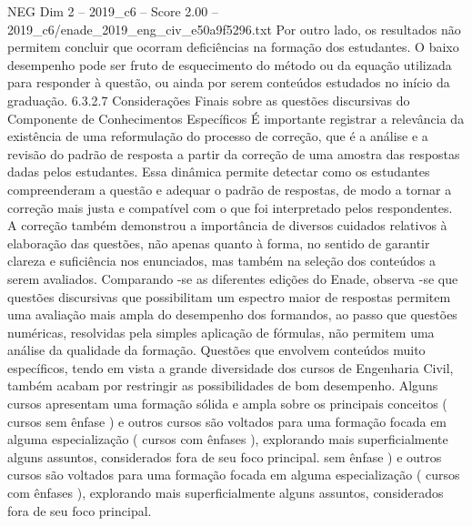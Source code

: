 \begin{textsample}{NEG Dim 2 – 2019\_c6 – Score 2.00 – 2019\_c6/enade\_2019\_eng\_civ\_e50a9f5296.txt}
Por outro lado, os resultados não permitem concluir que ocorram deficiências na formação dos estudantes.
O baixo desempenho pode ser fruto de esquecimento do método ou da equação utilizada para responder à questão, ou ainda por serem conteúdos estudados no início da graduação. 6.3.2.7 Considerações Finais sobre as questões discursivas do Componente de Conhecimentos Específicos É importante registrar a relevância da existência de uma reformulação do processo de correção, que é a análise e a revisão do padrão de resposta a partir da correção de uma amostra das respostas dadas pelos estudantes.
Essa dinâmica permite detectar como os estudantes compreenderam a questão e adequar o padrão de respostas, de modo a tornar a correção mais justa e compatível com o que foi interpretado pelos respondentes.
A correção também demonstrou a importância de diversos cuidados relativos à elaboração das questões, não apenas quanto à forma, no sentido de garantir clareza e suficiência nos enunciados, mas também na seleção dos conteúdos a serem avaliados.
Comparando -se as diferentes edições do Enade, observa -se que questões discursivas que possibilitam um espectro maior de respostas permitem uma avaliação mais ampla do desempenho dos formandos, ao passo que questões numéricas, resolvidas pela simples aplicação de fórmulas, não permitem uma análise da qualidade da formação.
Questões que envolvem conteúdos muito específicos, tendo em vista a grande diversidade dos cursos de Engenharia Civil, também acabam por restringir as possibilidades de bom desempenho.
Alguns cursos apresentam uma formação sólida e ampla sobre os principais conceitos ( cursos sem ênfase ) e outros cursos são voltados para uma formação focada em alguma especialização ( cursos com ênfases ), explorando mais superficialmente alguns assuntos, considerados fora de seu foco principal. sem ênfase ) e outros cursos são voltados para uma formação focada em alguma especialização ( cursos com ênfases ), explorando mais superficialmente alguns assuntos, considerados fora de seu foco principal.

\end{textsample}
